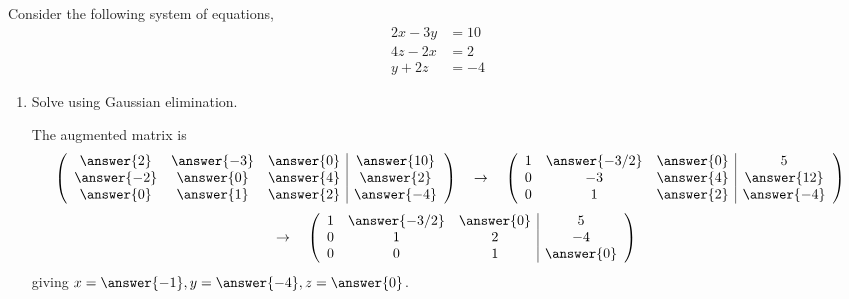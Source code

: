 \documentclass{ximera}
\author{Parisa Fatheddin}
\begin{document}
\begin{exercise}
  Consider the following system of equations,
  \begin{align*}
    2x-3y&= 10\\
    4z -2x &= 2\\
    y+2z &= -4
  \end{align*}

  \begin{enumerate}
  \item Solve using Gaussian elimination.
    \begin{prompt}
      The augmented matrix is
      \[
        \left(
          \begin{array}{ccc|c}
            \answer{2} & \answer{-3} & \answer{0} & \answer{10}  \\
            \answer{-2} & \answer{0} & \answer{4} & \answer{2}  \\
            \answer{0} & \answer{1} & \answer{2} & \answer{-4}
          \end{array}
        \right)
        \quad \rightarrow \quad
        \left(
          \begin{array}{ccc|c}
            1 & \answer{-3/2} & \answer{0} & 5  \\
            0 &-3 & \answer{4} & \answer{12}  \\
            0 & 1 & \answer{2} & \answer{-4}
          \end{array}
        \right)
      \]
      \[
        \quad \rightarrow \quad
        \left(
          \begin{array}{ccc|c}
            1 & \answer{-3/2} & \answer{0} & 5  \\
            0 &1 & 2& -4  \\
            0 & 0 & 1 & \answer{0}
          \end{array}
        \right)
      \]
      giving $x = \answer{-1}, y= \answer{-4}, z= \answer{0}$.
    \end{prompt}


\end{enumerate}
\end{exercise}
\end{document}
